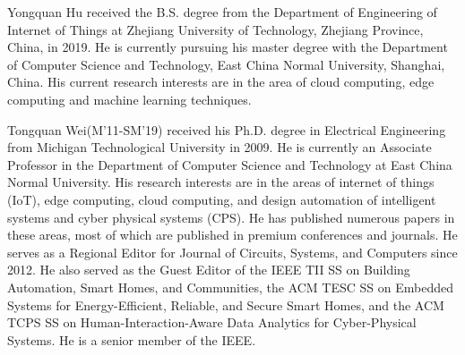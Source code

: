 \documentclass{ieeeaccess}
\theoremstyle{definition}
\begin{document}
\begin{IEEEbiography}{Yongquan Hu}
    received the B.S. degree from the Department of Engineering of Internet of Things at Zhejiang University of Technology, Zhejiang Province, China, in 2019. He is currently pursuing his master degree with the Department of Computer Science and Technology, East China Normal University, Shanghai, China. His current research interests are in the area of cloud computing, edge computing and machine learning techniques.
\end{IEEEbiography}

\begin{IEEEbiography}{Tongquan Wei(M'11-SM'19)}
    received his Ph.D. degree in Electrical Engineering from Michigan Technological University in 2009. He is currently an Associate Professor in the Department of Computer Science and Technology at East China Normal University. His research interests are in the areas of internet of things (IoT), edge computing, cloud computing, and design automation of intelligent systems and cyber physical systems (CPS). He has published numerous papers in these areas, most of which are published in premium conferences and journals. He serves as a Regional Editor for Journal of Circuits, Systems, and Computers since 2012. He also served as the Guest Editor of the IEEE TII SS on Building Automation, Smart Homes, and Communities, the ACM TESC SS on Embedded Systems for Energy-Efficient, Reliable, and Secure Smart Homes, and the ACM TCPS SS on Human-Interaction-Aware Data Analytics for Cyber-Physical Systems. He is a senior member of the IEEE.
\end{IEEEbiography}
\end{document}
